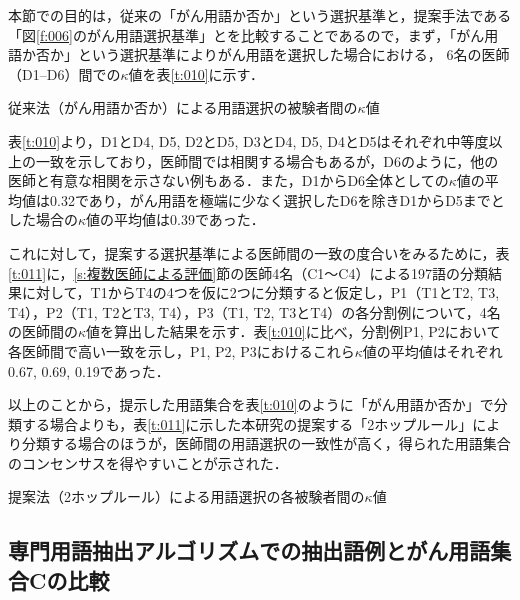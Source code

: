\documentclass[japanese]{jnlp_1.4}
\begin{document}
本節での目的は，従来の「がん用語か否か」という選択基準と，提案手法である「図\ref{f:006}のがん用語選択基準」とを比較することであるので，まず，「がん用語か否か」という選択基準によりがん用語を選択した場合における，
6名の医師（D1--D6）間での$\kappa$値を表\ref{t:010}に示す．

\begin{table}[b]
 \caption{従来法（がん用語か否か）による用語選択の被験者間の$\kappa$値}
 \begin{center}

 \end{center}
 \label{t:010}
\end{table}


表\ref{t:010}より，D1とD4, D5, D2とD5, D3とD4, D5, D4とD5はそれぞれ中等度以上の一致を示しており，医師間では相関する場合もあるが，D6のように，他の医師と有意な相関を示さない例もある．また，D1からD6全体としての$\kappa$値の平均値は0.32であり，がん用語を極端に少なく選択したD6を除きD1からD5までとした場合の$\kappa$値の平均値は0.39であった．

これに対して，提案する選択基準による医師間の一致の度合いをみるために，表\ref{t:011}に，\ref{s:複数医師による評価}節の医師4名（C1〜C4）による197語の分類結果に対して，T1からT4の4つを仮に2つに分類すると仮定し，P1（T1とT2, T3, T4），P2（T1, T2とT3, T4），P3（T1, T2, T3とT4）の各分割例について，4名の医師間の$\kappa$値を算出した結果を示す．表\ref{t:010}に比べ，分割例P1, P2において各医師間で高い一致を示し，P1, P2, P3におけるこれら$\kappa$値の平均値はそれぞれ0.67, 0.69, 0.19であった．

以上のことから，提示した用語集合を表\ref{t:010}のように「がん用語か否か」で分類する場合よりも，表\ref{t:011}に示した本研究の提案する「2ホップルール」により分類する場合のほうが，医師間の用語選択の一致性が高く，得られた用語集合のコンセンサスを得やすいことが示された．

\begin{table}[b]
 \caption{提案法（2ホップルール）による用語選択の各被験者間の$\kappa$値}
 \begin{center}

 \end{center}
 \label{t:011}
\end{table}



\subsection{専門用語抽出アルゴリズムでの抽出語例とがん用語集合Cの比較}
\label{s:専門用語抽出アルゴリズムでの抽出語例とがん用語集合Cの比較}
\end{document}

